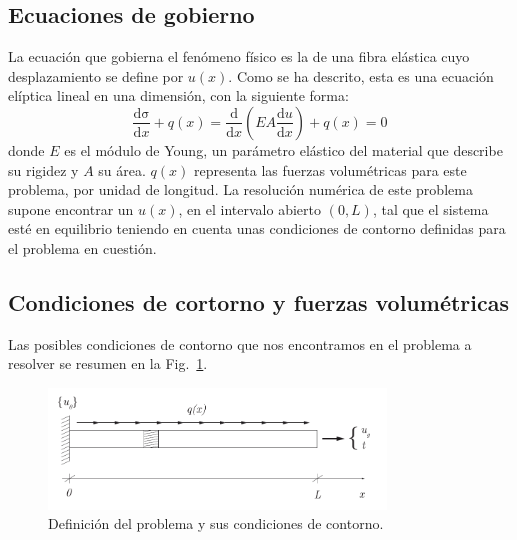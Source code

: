 \subsection{Ecuaciones de gobierno}

La ecuación que gobierna el fenómeno físico es la de una fibra elástica cuyo  desplazamiento se define por \(u(x)\). Como se ha descrito, esta es una ecuación elíptica lineal en una dimensión, con la siguiente forma:
\begin{equation}\label{eq:gov}
\frac{\mathrm{d \sigma}}{\mathrm{d} x} + q(x)
=\frac{\mathrm{d}}{\mathrm{d} x}\left(E A \frac{\mathrm{d} u}{\mathrm{d} x}\right)+q(x)=0
\end{equation}
donde  $E$ es el módulo de Young, un parámetro elástico del material que describe su rigidez y $A$ su \'area. $q(x)$ representa las fuerzas volumétricas para este problema, por unidad de longitud. La resolución numérica de este problema supone encontrar un \(u(x)\), en el intervalo abierto $(0,L)$, tal que el sistema esté en equilibrio teniendo en cuenta unas condiciones de contorno definidas para el problema en cuesti\'on.

\subsection{Condiciones de cortorno y fuerzas volumétricas}

Las posibles condiciones de contorno que nos encontramos en el problema a resolver se resumen en la Fig.~\ref{fig:CC1D}.

\begin{figure}[!htp]
\centering
\includegraphics[width=0.8\textwidth]{figuras_1/1D.pdf}
\caption{Definición del problema y sus condiciones de contorno.}
\label{fig:CC1D}
\end{figure}

